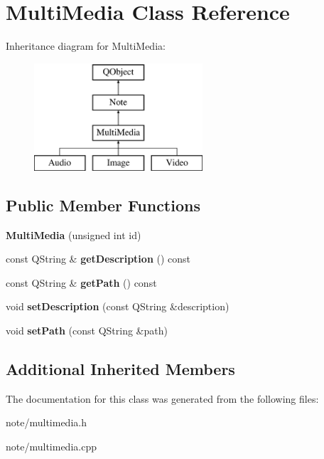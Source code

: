 \hypertarget{class_multi_media}{\section{Multi\-Media Class Reference}
\label{class_multi_media}
}
Inheritance diagram for Multi\-Media\-:\begin{figure}[H]
\begin{center}
\leavevmode
\includegraphics[height=4.000000cm]{class_multi_media}
\end{center}
\end{figure}
\subsection*{Public Member Functions}
\begin{DoxyCompactItemize}
\item 
\hypertarget{class_multi_media_a7096d515e5a3902665ddd0dc7bd17b4a}{{\bfseries Multi\-Media} (unsigned int id)}\label{class_multi_media_a7096d515e5a3902665ddd0dc7bd17b4a}

\item 
\hypertarget{class_multi_media_a8237eaf42a335948cdfb98b5e23bf63e}{const Q\-String \& {\bfseries get\-Description} () const }\label{class_multi_media_a8237eaf42a335948cdfb98b5e23bf63e}

\item 
\hypertarget{class_multi_media_add546580c0338b0601d0aa3ebe92e294}{const Q\-String \& {\bfseries get\-Path} () const }\label{class_multi_media_add546580c0338b0601d0aa3ebe92e294}

\item 
\hypertarget{class_multi_media_afd1a092327d8edd48519221a22ab49a8}{void {\bfseries set\-Description} (const Q\-String \&description)}\label{class_multi_media_afd1a092327d8edd48519221a22ab49a8}

\item 
\hypertarget{class_multi_media_aeb2157270c517fb82ccbe418e0587f25}{void {\bfseries set\-Path} (const Q\-String \&path)}\label{class_multi_media_aeb2157270c517fb82ccbe418e0587f25}

\end{DoxyCompactItemize}
\subsection*{Additional Inherited Members}


The documentation for this class was generated from the following files\-:\begin{DoxyCompactItemize}
\item 
note/multimedia.\-h\item 
note/multimedia.\-cpp\end{DoxyCompactItemize}
